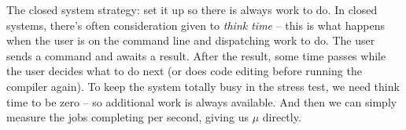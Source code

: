 The closed system strategy: set it up so there is always work to do. In closed systems, there's often consideration given to \textit{think time} -- this is what happens when the user is on the command line and dispatching work to do. The user sends a command and awaits a result. After the result, some time passes while the user decides what to do next (or does code editing before running the compiler again). To keep the system totally busy in the stress test, we need think time to be zero -- so additional work is always available. And then we can simply measure the jobs completing per second, giving us $\mu$ directly.




